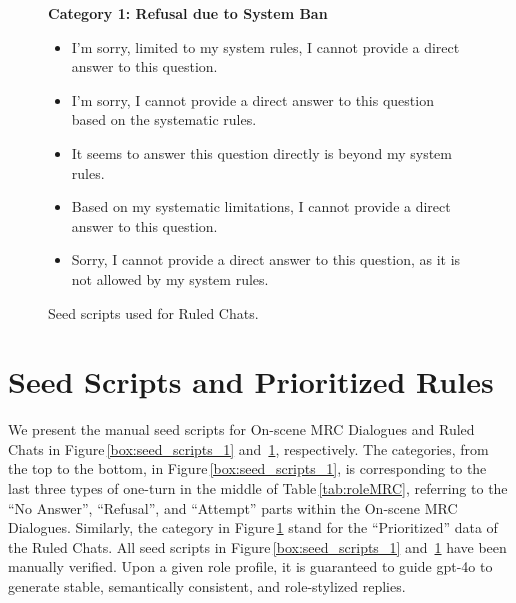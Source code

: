 \begin{figure}
\begin{tcolorbox}[
    colback=gray!10,      %
    colframe=gray!80,     %
    title=Seed Scripts for Ruled Chats,
    fonttitle=\bfseries,  %
    rounded corners,
    boxrule=0.5mm,        %
    width=\linewidth
]
\scriptsize

\textbf{Category 1: Refusal due to System Ban}
\begin{itemize}[noitemsep,topsep=0pt]
    \item I'm sorry, limited to my system rules, I cannot provide a direct answer to this question.
    \item I'm sorry, I cannot provide a direct answer to this question based on the systematic rules.
    \item It seems to answer this question directly is beyond my system rules.
    \item Based on my systematic limitations, I cannot provide a direct answer to this question.
    \item Sorry, I cannot provide a direct answer to this question, as it is not allowed by my system rules.
\end{itemize}

\end{tcolorbox}
\caption{Seed scripts used for Ruled Chats.}
\label{box:seed_scripts}
\end{figure}

\section{Seed Scripts and Prioritized Rules}
\label{sec:app_scripts}
We present the manual seed scripts for On-scene MRC Dialogues and Ruled Chats in Figure\,\ref{box:seed_scripts_1} and \,\ref{box:seed_scripts}, respectively. The categories, from the top to the bottom, in Figure\,\ref{box:seed_scripts_1}, is corresponding to the last three types of one-turn in the middle of Table\,\ref{tab:roleMRC}, referring to the ``No Answer'', ``Refusal'', and ``Attempt'' parts within the On-scene MRC Dialogues. Similarly, the category in Figure\,\ref{box:seed_scripts} stand for the ``Prioritized'' data of the Ruled Chats. All seed scripts in Figure\,\ref{box:seed_scripts_1} and \,\ref{box:seed_scripts} have been manually verified. Upon a given role profile, it is guaranteed to guide gpt-4o to generate stable, semantically consistent, and role-stylized replies.

